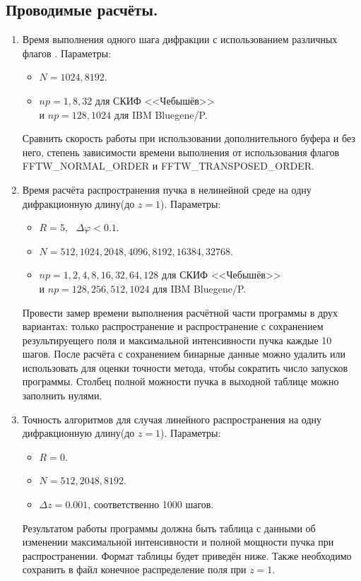 \subsection{Проводимые расчёты.}
\begin{enumerate}
	\item Время выполнения одного шага дифракции с использованием различных флагов \fftw. Параметры:
		\begin{itemize}
			\item $N = 1024, 8192$.
			\item $np = 1, 8, 32$ для СКИФ <<Чебышёв>> \\ и $np = 128, 1024$ для IBM Bluegene/P.
		\end{itemize}
		Сравнить скорость работы {\fftw} при использовании дополнительного буфера и без него,
		степень зависимости времени выполнения от использования флагов \\ FFTW\_NORMAL\_ORDER и FFTW\_TRANSPOSED\_ORDER.
	\item Время расчёта распространения пучка в нелинейной среде на одну дифракционную длину(до $z=1$). Параметры:
		\begin{itemize}
			\item $R = 5,\text{ }\Delta\varphi < 0.1$.
			\item $N = 512, 1024, 2048, 4096, 8192, 16384, 32768$.
			\item $np = 1, 2, 4, 8, 16, 32, 64, 128$ для СКИФ <<Чебышёв>> \\ и $np = 128, 256, 512, 1024$ для IBM Bluegene/P.
		\end{itemize}
		Провести замер времени выполнения расчётной части программы в друх вариантах:
		только распространение и распространение с сохранением результируещего поля и максимальной интенсивности пучка каждые 10 шагов.
		После расчёта с сохранением бинарные данные можно удалить или использовать для оценки точности метода, чтобы сократить
		число запусков программы. Столбец полной можности пучка в выходной таблице можно заполнить нулями.
		
	\item Точность алгоритмов для случая линейного распространения на одну дифракционную длину(до $z=1$). Параметры:
		\begin{itemize}
			\item $R = 0$.
			\item $N = 512, 2048, 8192$.
			\item $\Delta z = 0.001$, соответственно 1000 шагов.
		\end{itemize}
		Результатом работы программы должна быть таблица с данными об изменении максимальной интенсивности
		и полной мощности пучка при распространении. Формат таблицы будет приведён ниже.
		Также необходимо сохранить в файл конечное распределение поля при $z=1$.
	

\end{enumerate}
